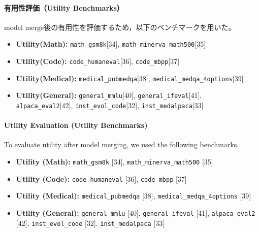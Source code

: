 \documentclass{article}
\begin{document}
\paragraph{有用性評価（Utility Benchmarks）}
model merge後の有用性を評価するため，以下のベンチマークを用いた。

\begin{itemize}
    \item \textbf{Utility(Math):}
    \texttt{math\_gsm8k}[34],
    \texttt{math\_minerva\_math500}[35]

    \item \textbf{Utility(Code):}
    \texttt{code\_humaneval}[36],
    \texttt{code\_mbpp}[37]

    \item \textbf{Utility(Medical):}
    \texttt{medical\_pubmedqa}[38],
    \texttt{medical\_medqa\_4options}[39]

    \item \textbf{Utility(General):}
    \texttt{general\_mmlu}[40],
    \texttt{general\_ifeval}[41],
    \texttt{alpaca\_eval2}[42],
    \texttt{inst\_evol\_code}[32],
    \texttt{inst\_medalpaca}[33]
\end{itemize}

\paragraph{Utility Evaluation (Utility Benchmarks)}
To evaluate utility after model merging, we used the following benchmarks.

\begin{itemize}
    \item \textbf{Utility (Math):} \texttt{math\_gsm8k} [34], \texttt{math\_minerva\_math500} [35]
    \item \textbf{Utility (Code):} \texttt{code\_humaneval} [36], \texttt{code\_mbpp} [37]
    \item \textbf{Utility (Medical):} \texttt{medical\_pubmedqa} [38], \texttt{medical\_medqa\_4options} [39]
    \item \textbf{Utility (General):} \texttt{general\_mmlu} [40], \texttt{general\_ifeval} [41], \texttt{alpaca\_eval2} [42], \texttt{inst\_evol\_code} [32], \texttt{inst\_medalpaca} [33]
\end{itemize}

\end{document}
